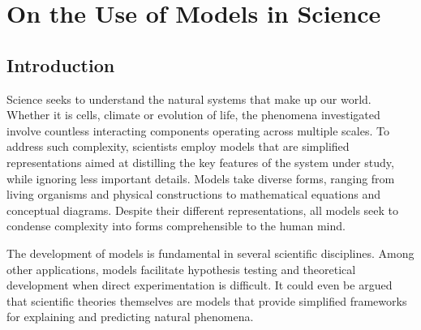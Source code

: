 \chapter{On the Use of Models in Science}
\label{ch:01} 



\vspace{1cm}

\section{Introduction}
Science seeks to understand the natural systems that make up our world. Whether it is cells, climate or evolution of life, the phenomena investigated involve countless interacting components operating across multiple scales. To address such complexity, scientists employ models that are simplified representations aimed at distilling the key features of the system under study, while ignoring less important details. Models take diverse forms, ranging from living organisms and physical constructions to mathematical equations and conceptual diagrams. Despite their different representations, all models seek to condense complexity into forms comprehensible to the human mind.

The development of models is fundamental in several scientific disciplines. Among other applications, models facilitate hypothesis testing and theoretical development when direct experimentation is difficult. It could even be argued that scientific theories themselves are models that provide simplified frameworks for explaining and predicting natural phenomena.

